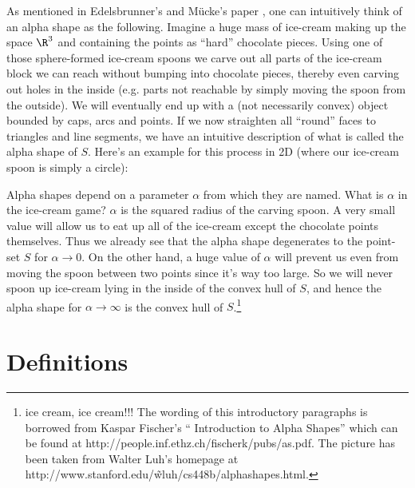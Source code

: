 As mentioned in Edelsbrunner's and M\"ucke's paper \cite{em-tdas-94},
one can intuitively think of an alpha shape  as the
following. Imagine a huge mass of ice-cream making up the space $\R^3$
and containing the points as ``hard'' chocolate pieces. Using one of
those sphere-formed ice-cream spoons we carve out all parts of the
ice-cream block we can reach without bumping into chocolate pieces,
thereby even carving out holes in the inside (e.g. parts not reachable
by simply moving the spoon from the outside). We will eventually end
up with a (not necessarily convex) object bounded by caps, arcs and
points. If we now straighten all ``round'' faces to triangles and line
segments, we have an intuitive description of what is called the
alpha shape  of $S$. Here's an example for this process in 2D (where
our ice-cream spoon is simply a circle):

Alpha shapes depend on a parameter $\alpha$ from which they
are named.                                                                  
What is $\alpha$ in the ice-cream game?  $\alpha$ is the squared radius of the
carving spoon. A very small value will allow us to eat up all of the
ice-cream except the chocolate points themselves. Thus we already see
that the alpha shape  degenerates to the point-set $S$ for
$\alpha \rightarrow 0$. On the other hand, a huge value of $\alpha$
will prevent us even from moving the spoon between two points since
it's way too large. So we will never spoon up ice-cream lying in the
inside of the convex hull of $S$, and hence the alpha shape  for
$\alpha \rightarrow \infty$ is the convex hull of $S$.\footnote{ice cream, ice cream!!!
The wording of this introductory paragraphs is borrowed from  Kaspar Fischer's
`` Introduction to Alpha Shapes'' which can be found at 
http://people.inf.ethz.ch/fischerk/pubs/as.pdf.
The picture has been taken from Walter Luh's homepage at
http://www.stanford.edu/\~wluh/cs448b/alphashapes.html.}


\section{Definitions}


